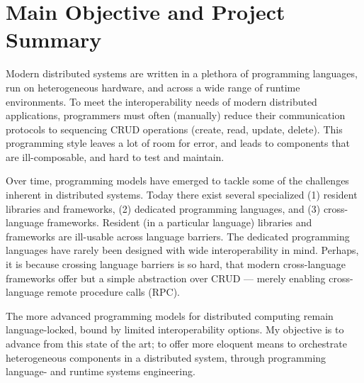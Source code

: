 \section{Main Objective and Project Summary}
\label{sec:main-objective-and-project-summary}

Modern distributed systems are written in a plethora of programming
languages, run on heterogeneous hardware, and across a wide range of
runtime environments. To meet the interoperability needs of modern
distributed applications, programmers must often (manually) reduce
their communication protocols to sequencing CRUD operations (create,
read, update, delete). This programming style leaves a lot of room for
error, and leads to components that are ill-composable, and hard to
test and maintain.

Over time, programming models have emerged to tackle some of the
challenges inherent in distributed systems.  Today there exist several
specialized (1) resident libraries and frameworks, (2) dedicated
programming languages, and (3) cross-language frameworks. Resident (in
a particular language) libraries and frameworks are ill-usable across
language barriers. The dedicated programming languages have rarely
been designed with wide interoperability in mind. Perhaps, it is
because crossing language barriers is so hard, that modern
cross-language frameworks offer but a simple abstraction over CRUD ---
merely enabling cross-language remote procedure calls (RPC).

The more advanced programming models for distributed computing
\cite{miller2017dist-prog-book} remain language-locked, bound by
limited interoperability options. My objective is to advance from this
state of the art; to offer more eloquent means to orchestrate
heterogeneous components in a distributed system, through programming
language- and runtime systems engineering.
